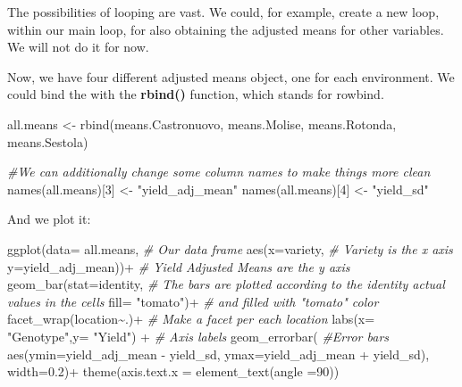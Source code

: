 \documentclass[
]{book}
\newenvironment{Shaded}{\begin{snugshade}}{\end{snugshade}}
\newcommand{\AttributeTok}[1]{\textcolor[rgb]{0.77,0.63,0.00}{#1}}
\newcommand{\CommentTok}[1]{\textcolor[rgb]{0.56,0.35,0.01}{\textit{#1}}}
\newcommand{\DecValTok}[1]{\textcolor[rgb]{0.00,0.00,0.81}{#1}}
\newcommand{\FloatTok}[1]{\textcolor[rgb]{0.00,0.00,0.81}{#1}}
\newcommand{\FunctionTok}[1]{\textcolor[rgb]{0.00,0.00,0.00}{#1}}
\newcommand{\NormalTok}[1]{#1}
\newcommand{\OtherTok}[1]{\textcolor[rgb]{0.56,0.35,0.01}{#1}}
\newcommand{\SpecialCharTok}[1]{\textcolor[rgb]{0.00,0.00,0.00}{#1}}
\newcommand{\StringTok}[1]{\textcolor[rgb]{0.31,0.60,0.02}{#1}}
\begin{document}
The possibilities of looping are vast. We could, for example, create a new loop, within our main loop, for also obtaining the adjusted means for other variables. We will not do it for now.

Now, we have four different adjusted means object, one for each environment. We could bind the with the \textbf{rbind()} function, which stands for rowbind.

\begin{Shaded}
\begin{Highlighting}[]
\NormalTok{all.means }\OtherTok{\textless{}{-}} \FunctionTok{rbind}\NormalTok{(means.Castronuovo, means.Molise, means.Rotonda, means.Sestola)}

\CommentTok{\#We can additionally change some column names to make things more clean}
\FunctionTok{names}\NormalTok{(all.means)[}\DecValTok{3}\NormalTok{] }\OtherTok{\textless{}{-}} \StringTok{"yield\_adj\_mean"}
\FunctionTok{names}\NormalTok{(all.means)[}\DecValTok{4}\NormalTok{] }\OtherTok{\textless{}{-}} \StringTok{"yield\_sd"}
\end{Highlighting}
\end{Shaded}

And we plot it:

\begin{Shaded}
\begin{Highlighting}[]
\FunctionTok{ggplot}\NormalTok{(}\AttributeTok{data=}\NormalTok{ all.means,                     }\CommentTok{\# Our data frame}
       \FunctionTok{aes}\NormalTok{(}\AttributeTok{x=}\NormalTok{variety,                       }\CommentTok{\# Variety is the x axis}
           \AttributeTok{y=}\NormalTok{yield\_adj\_mean))}\SpecialCharTok{+}              \CommentTok{\# Yield Adjusted Means are the y axis}
  \FunctionTok{geom\_bar}\NormalTok{(}\AttributeTok{stat=}\StringTok{\textquotesingle{}identity\textquotesingle{}}\NormalTok{,                 }\CommentTok{\# The bars are plotted according to the identity actual values in the cells}
           \AttributeTok{fill=} \StringTok{"tomato"}\NormalTok{)}\SpecialCharTok{+}                 \CommentTok{\# and filled with "tomato" color}
  \FunctionTok{facet\_wrap}\NormalTok{(location}\SpecialCharTok{\textasciitilde{}}\NormalTok{.)}\SpecialCharTok{+}                        \CommentTok{\# Make a facet per each location }
  \FunctionTok{labs}\NormalTok{(}\AttributeTok{x=} \StringTok{"Genotype"}\NormalTok{,}\AttributeTok{y=} \StringTok{"Yield"}\NormalTok{)  }\SpecialCharTok{+}         \CommentTok{\# Axis labels}
  \FunctionTok{geom\_errorbar}\NormalTok{(                            }\CommentTok{\#Error bars}
          \FunctionTok{aes}\NormalTok{(}\AttributeTok{ymin=}\NormalTok{yield\_adj\_mean }\SpecialCharTok{{-}}\NormalTok{ yield\_sd, }
              \AttributeTok{ymax=}\NormalTok{yield\_adj\_mean }\SpecialCharTok{+}\NormalTok{ yield\_sd),}
              \AttributeTok{width=}\FloatTok{0.2}\NormalTok{)}\SpecialCharTok{+}
  \FunctionTok{theme}\NormalTok{(}\AttributeTok{axis.text.x =} \FunctionTok{element\_text}\NormalTok{(}\AttributeTok{angle =}\DecValTok{90}\NormalTok{))}
\end{Highlighting}
\end{Shaded}
\end{document}
